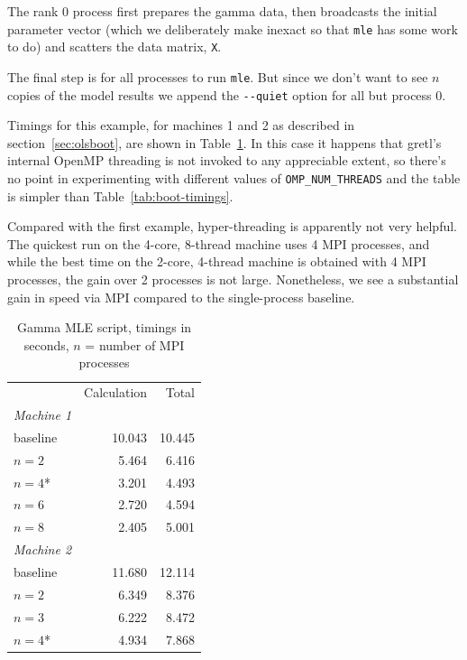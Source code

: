 \documentclass{article}
\begin{document}
The rank 0 process first prepares the gamma data, then broadcasts the
initial parameter vector (which we deliberately make inexact so that
\texttt{mle} has some work to do) and scatters the data matrix,
\texttt{X}.

The final step is for all processes to run \texttt{mle}. But since we
don't want to see $n$ copies of the model results we append the
\verb|--quiet| option for all but process 0.

Timings for this example, for machines 1 and 2 as described in
section~\ref{sec:olsboot}, are shown in Table~\ref{tab:mle-timings}.
In this case it happens that gretl's internal \textsf{OpenMP}
threading is not invoked to any appreciable extent, so there's no
point in experimenting with different values of \verb|OMP_NUM_THREADS|
and the table is simpler than Table~\ref{tab:boot-timings}.

Compared with the first example, hyper-threading is apparently not
very helpful. The quickest run on the 4-core, 8-thread machine uses 4
MPI processes, and while the best time on the 2-core, 4-thread machine
is obtained with 4 MPI processes, the gain over 2 processes is not
large. Nonetheless, we see a substantial gain in speed via MPI
compared to the single-process baseline.

\begin{table}[htbp]
\begin{center}
\begin{tabular}{lrr}
         & Calculation & Total \\
\textit{Machine 1} \\[2pt]
\quad baseline & 10.043 & 10.445 \\
\quad $n=2$ & 5.464 & 6.416 \\
\quad $n=4$* & 3.201 & 4.493 \\
\quad $n=6$ & 2.720 & 4.594 \\
\quad $n=8$ & 2.405 & 5.001 \\[2pt]
\textit{Machine 2} \\[2pt]
\quad baseline & 11.680 & 12.114 \\
\quad $n=2$ & 6.349 & 8.376 \\
\quad $n=3$ & 6.222 & 8.472 \\
\quad $n=4$* & 4.934 & 7.868
\end{tabular}
\end{center}
\caption{Gamma MLE script, timings in seconds, $n$ = number of MPI
  processes}
\label{tab:mle-timings}
\end{table}
\end{document}
